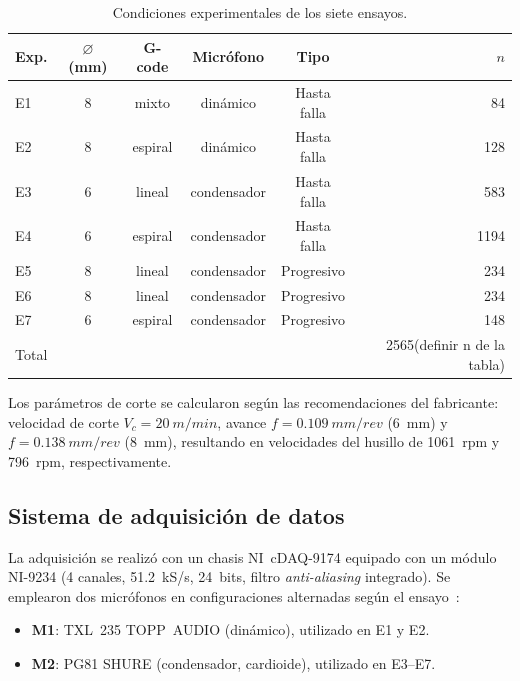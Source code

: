 \documentclass[10pt,twocolumn]{article}
\begin{document}
\begin{table}[htbp]
\centering
\caption{Condiciones experimentales de los siete ensayos.}
\label{tab:experimentos}
\footnotesize
\begin{tabular}{@{}lccccr@{}}
\toprule
Exp. & $\varnothing$ (mm) & G-code & Micrófono & Tipo & $n$ \\
\midrule
E1 & 8 & mixto    & dinámico     & Hasta falla & 84 \\
E2 & 8 & espiral  & dinámico     & Hasta falla & 128 \\
E3 & 6 & lineal   & condensador  & Hasta falla & 583 \\
E4 & 6 & espiral  & condensador  & Hasta falla & 1194 \\
E5 & 8 & lineal   & condensador  & Progresivo  & 234 \\
E6 & 8 & lineal   & condensador  & Progresivo  & 234 \\
E7 & 6 & espiral  & condensador  & Progresivo  & 148 \\
\midrule
\multicolumn{5}{l}{Total} & 2565(definir n de la tabla) \\

\bottomrule
\end{tabular}
\end{table}

Los parámetros de corte se calcularon según las recomendaciones del
fabricante: velocidad de corte $V_c = \SI{20}{m/min}$, avance
$f = \SI{0.109}{mm/rev}$ (6~mm) y $f = \SI{0.138}{mm/rev}$ (8~mm),
resultando en velocidades del husillo de \SI{1061}{rpm} y \SI{796}{rpm},
respectivamente.

\subsection{Sistema de adquisición de datos}

La adquisición se realizó con un chasis NI~cDAQ-9174 equipado con un
módulo NI-9234 (4 canales, \SI{51.2}{kS/s}, 24~bits, filtro
\textit{anti-aliasing} integrado). Se emplearon dos micrófonos en
configuraciones alternadas según el ensayo~\cite{orejarena2014}:

\begin{itemize}
  \item \textbf{M1}: TXL~235 TOPP~AUDIO (dinámico), utilizado en E1 y E2.
  \item \textbf{M2}: PG81 SHURE (condensador, cardioide), utilizado en
    E3--E7.
\end{itemize}
\end{document}
